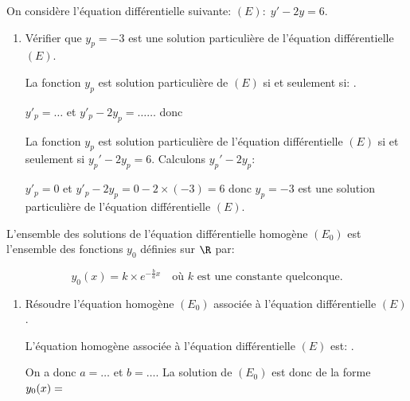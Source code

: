 \begin{exemple}{}

	On considère l'équation différentielle suivante: $(E):\; y'-2y=6$.
\begin{enumerate}[series=A, resume]
	\item Vérifier que $y_p=-3$ est une solution particulière de l'équation différentielle $(E)$.
	
	
	\begin{blocvisiblex}[height=2]
    {La fonction $y_p$ est solution particulière de $(E)$ si et seulement si: 	\dotfill{}.
	
	\medskip

	$y'_p= \ldots{}$ et $y'_p-2y_p=\ldots{}\ldots{}$ donc \dotfill{}

	\dotfill{}
	
	}
La fonction $y_p$ est solution particulière de l'équation différentielle $(E)$ si et seulement si $y_p'-2y_p=6$. Calculons $y_p'-2y_p$:
	
	$y'_p=0$ et $y'_p-2y_p=0-2\times(-3)=6$ donc $y_p=-3$ est une solution particulière de l'équation différentielle $(E)$.
	
	
\end{blocvisiblex}
	\end{enumerate}


	\medskip

	\begin{propriete}[Résolution d'une équation différentielle homogène $(E_0): \; ay'+by=0$]{}

		L'ensemble des solutions de l'équation différentielle homogène $(E_0)$ est l'ensemble des fonctions $y_0$ définies sur $\R$ par:

\[y_0(x)=k \times e^{-\frac{b}{a}x} \quad \text{où $k$ est une constante quelconque.}\]

	\end{propriete}

\begin{enumerate}[series=A, resume]


	\item Résoudre l'équation homogène $(E_0)$ associée à l'équation différentielle $(E)$.
	
\begin{blocvisiblex}[height=2]
    {
L'équation homogène associée à l'équation différentielle $(E)$ est: \dotfill{}.

\medskip

On a donc $a=\ldots{}$ et $b=\ldots{}$. La solution de $(E_0)$ est donc de la forme $y_0(x)=\dotfill{}$

}
\end{blocvisiblex}
\end{enumerate}
\end{exemple}
